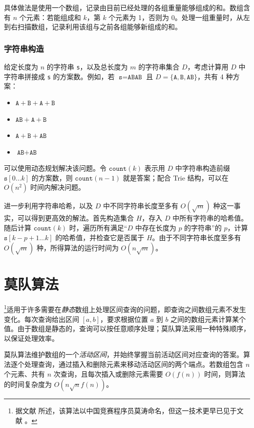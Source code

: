 具体做法是使用一个数组，记录由目前已经处理的各组重量能够组成的和。数组含有 $n$ 个元素：若能组成和 $k$，第 $k$ 个元素为 1，否则为 0。处理一组重量时，从左到右扫描数组，记录利用该组与之前各组能够新组成的和。

\subsubsection{字符串构造}

给定长度为 $n$ 的字符串 \texttt{s}，以及总长度为 $m$ 的字符串集合 $D$，考虑计算用 $D$ 中字符串拼接成 \texttt{s} 的方案数。例如，若 $\texttt{s}=\texttt{ABAB}$ 且 $D=\{\texttt{A},\texttt{B},\texttt{AB}\}$，共有 4 种方案：

\begin{itemize}[noitemsep]
\item $\texttt{A}+\texttt{B}+\texttt{A}+\texttt{B}$
\item $\texttt{AB}+\texttt{A}+\texttt{B}$
\item $\texttt{A}+\texttt{B}+\texttt{AB}$
\item $\texttt{AB}+\texttt{AB}$
\end{itemize}

可以使用动态规划解决该问题。令 $\texttt{count}(k)$ 表示用 $D$ 中字符串构造前缀 $\texttt{s}[0 \ldots k]$ 的方案数，则 $\texttt{count}(n-1)$ 就是答案；配合 Trie 结构，可以在 $O(n^2)$ 时间内解决问题。

进一步利用字符串哈希，以及 $D$ 中不同字符串长度至多有 $O(\sqrt m)$ 种这一事实，可以得到更高效的解法。首先构造集合 $H$，存入 $D$ 中所有字符串的哈希值。随后计算 $\texttt{count}(k)$ 时，遍历所有满足“$D$ 中存在长度为 $p$ 的字符串”的 $p$，计算 $\texttt{s}[k-p+1 \ldots k]$ 的哈希值，并检查它是否属于 $H$。由于不同字符串长度至多有 $O(\sqrt m)$ 种，所得算法的运行时间为 $O(n \sqrt m)$。

\section{莫队算法}


\footnote{据文献 \cite{cod15} 所述，该算法以中国竞赛程序员莫涛命名，但这一技术更早已见于文献 \cite{ken06}。}适用于许多需要在\emph{静态}数组上处理区间查询的问题，即查询之间数组元素不发生变化。每次查询给出区间 $[a,b]$，要求根据位置 $a$ 到 $b$ 之间的数组元素计算某个值。由于数组是静态的，查询可以按任意顺序处理；莫队算法采用一种特殊顺序，以保证处理效率。

莫队算法维护数组的一个\emph{活动区间}，并始终掌握当前活动区间对应查询的答案。算法逐个处理查询，通过插入和删除元素来移动活动区间的两个端点。若数组包含 $n$ 个元素、共有 $n$ 次查询，且每次插入或删除元素需要 $O(f(n))$ 时间，则算法的时间复杂度为 $O(n \sqrt n f(n))$。


